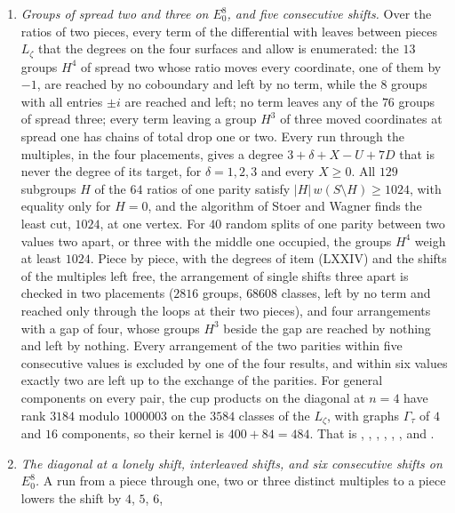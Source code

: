 \begin{enumerate}[label=\textup{(\Roman*)},leftmargin=*]
  .
\item \emph{Groups of spread two and three on $E_0^8$, and five consecutive
  shifts.} Over the ratios of two pieces, every term of the differential with
  leaves between pieces $L_{\zeta}$ that the degrees on the four surfaces and
   allow is enumerated: the $13$ groups $H^{4}$ of
  spread two whose ratio moves every coordinate, one of them by $-1$, are
  reached by no coboundary and left by no term, while the $8$ groups with all
  entries $\pm i$ are reached and left; no term leaves any of the $76$ groups
  of spread three; every term leaving a group $H^{3}$ of three moved
  coordinates at spread one has chains of total drop one or two. Every run
  through the multiples, in the four placements, gives a degree
  $3+\delta+X-U+7D$ that is never the degree of its target, for $\delta=1,2,3$
  and every $X\ge0$. All $129$ subgroups $H$ of the $64$ ratios of one parity
  satisfy $|H|\,w(S\setminus H)\ge1024$, with equality only for $H=0$, and
  the algorithm of Stoer and Wagner finds the least cut, $1024$, at one
  vertex. For $40$ random splits of one parity between two values two apart,
  or three with the middle one occupied, the groups $H^{4}$ weigh at least
  $1024$. Piece by piece, with the degrees of item (LXXIV) and the shifts of
  the multiples left free, the arrangement of single shifts three apart is
  checked in two placements ($2816$ groups, $68608$ classes, left by no term
  and reached only through the loops at their two pieces), and four
  arrangements with a gap of four, whose groups $H^{3}$ beside the gap are
  reached by nothing and left by nothing. Every arrangement of the two
  parities within five consecutive values is excluded by one of the four
  results, and within six values exactly two are left up to the exchange of
  the parities. For general components on every pair, the cup products on
  the diagonal at $n=4$ have rank $3184$ modulo $1000003$ on the $3584$
  classes of the $L_{\zeta}$, with graphs $\Gamma_{\tau}$ of $4$ and $16$
  components, so their kernel is $400+84=484$. That is
  , , ,
  , , ,
   and .
\item \emph{The diagonal at a lonely shift, interleaved shifts, and six
  consecutive shifts on $E_0^8$.} A run from a piece through one, two or
  three distinct multiples to a piece lowers the shift by $4$, $5$, $6$,

\end{enumerate}

